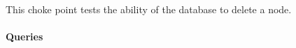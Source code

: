 
This choke point tests the ability of the database to delete a node.


\paragraph{Queries}
{\raggedright

}